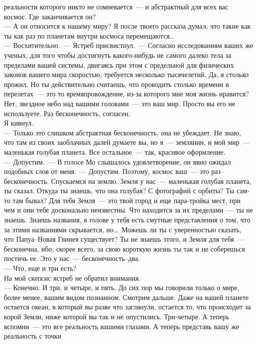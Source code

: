 реальности которого никто не сомневается~--- и абстрактный для всех вас космос. 
Где заканчивается он?\\
--- А он относится к нашему миру? Я после твоего рассказа думал, что такие как ты 
как раз по планетам внутри космоса перемещаются\ldots\\
--- Восхитительно.~--- Ястреб присвистнул.~--- Согласно исследованиям ваших же 
ученых, 
для того чтобы достигнуть какого-нибудь не самого далеко тела за пределами 
вашей 
системы, двигаясь при этом с предельной для физических законов вашего мира 
скоростью, требуется несколько тысячелетий. Да, я столько прожил. Но ты 
действительно считаешь, что проводить столько времени в перелетах~--- это то 
времяпровождение, из-за которого мне моя жизнь нравится? Нет, звездное небо над 
вашими головами~--- это ваш мир. Просто вы его не используете. Раз 
бесконечность, 
согласен.\\
Я кивнул.\\
--- Только это слишком абстрактная бесконечность, она не убеждает. Не знаю, что 
там из своих заоблачных далей думаете вы, но я~--- землянин, и мой мир~--- 
маленькая голубая планета. Все остальное~--- так, красивое оформление.\\
--- Допустим.~--- В голосе Мо слышалось удовлетворение, он явно ожидал подобных 
слов от меня.~--- Допустим. Поэтому, космос ваш~--- это раз--бесконечность. 
Спускаемся на землю. Земля у нас~--- маленькая голубая планета, ты сказал. Откуда ты знаешь, 
что она голубая? С фотографий с орбиты? Ты сам-то там бывал? Для тебя Земля~--- это 
твой город и еще пара-тройка мест, при чем и они тебе досконально неизвестны. 
Что находится за их пределами~--- ты не знаешь. Знаешь названия, в голове у 
тебя есть смутные представления о том, что за этими названиями скрывается, но\ldots\ 
Можешь ли ты с уверенностью сказать, что Папуа--Новая Гвинея существует? Ты не 
знаешь этого, и Земля для тебя~--- бесконечна, ибо, скорее всего, за свою 
короткую жизнь ты так и не соберешься постичь ее. Это у нас~--- бесконечность--два.\\
--- Что, еще и три есть?\\
На мой скепсис ястреб не обратил внимания.\\
--- Конечно. И три, и четыре, и пять. До сих пор мы говорили только о мире, более 
менее, вашим видом познанном. Смотрим дальше. Даже на вашей планете остается 
океан, в который вы разве что заглянули, остается то, что происходит за корой 
Земли, ниже которой вы так и не опустились. Три-четыре. А теперь вспомни~--- 
это все реальность вашими глазами. А теперь представь вашу же реальность с точки 
